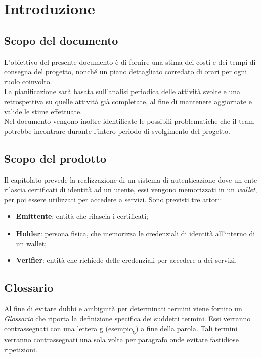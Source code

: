 \section{Introduzione}

\subsection{Scopo del documento}
L’obiettivo del presente documento è di fornire una stima dei costi e dei tempi di consegna del progetto, nonché un piano dettagliato corredato di orari per ogni ruolo coinvolto. \\
La pianificazione sarà basata sull’analisi periodica delle attività svolte e una retrospettiva su quelle attività già completate, al fine di mantenere aggiornate e valide le 
stime effettuate. \\ Nel documento vengono inoltre identificate le possibili problematiche che il team potrebbe incontrare durante l’intero periodo di svolgimento del progetto.

\subsection{Scopo del prodotto}
Il capitolato prevede la realizzazione di un sistema di autenticazione dove un ente rilascia certificati di identità ad un utente, essi vengono memorizzati in un \textit{wallet\glo}, 
per poi essere utilizzati per accedere a servizi. Sono previsti tre attori:
\begin{itemize}
    \item \textbf{Emittente}: entità che rilascia i certificati;
    \item \textbf{Holder}: persona fisica, che memorizza le credenziali di identità all'interno di un wallet\glo;
    \item \textbf{Verifier}: entità che richiede delle credenziali per accedere a dei servizi.
\end{itemize}

\subsection{Glossario}
Al fine di evitare dubbi e ambiguità per determinati termini viene fornito un \textit{Glossario} che riporta la definizione specifica dei suddetti termini. 
Essi verranno contrassegnati con una lettera g (esempio\textsubscript{g}) a fine della parola. 
Tali termini verranno contrassegnati una sola volta per paragrafo onde evitare fastidiose ripetizioni. 

